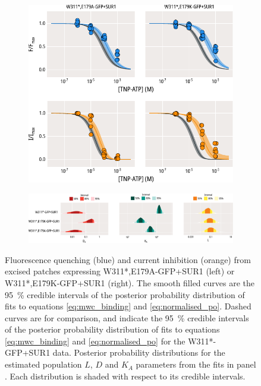 \begin{figure}[h]
	\centering
	\begin{subfigure}[t]{0.9\textwidth}
		\caption{}\label{ch5fig:mwc_e179_1}
		\centering
		\includegraphics[width=\textwidth]{mwc_e179_1.pdf}
	\end{subfigure}
	\vfill
	\begin{subfigure}[t]{0.9\textwidth}
		\caption{}\label{ch5fig:mwc_e179_2}
		\centering
		\includegraphics[width=\textwidth]{mwc_e179_2.pdf}
	\end{subfigure}
	\caption[E179 mutations affect gating and nucleotide binding]{
	 Fluorescence quenching (blue) and current inhibition (orange) from excised patches expressing W311*,E179A-GFP+SUR1 (left) or W311*,E179K-GFP+SUR1 (right).
	The smooth filled curves are the \SI{95}{\percent} credible intervals of the posterior probability distribution of fits to equations \ref{eq:mwc_binding} and \ref{eq:normalised_po}.
	Dashed curves are for comparison, and indicate the \SI{95}{\percent} credible intervals of the posterior probability distribution of fits to equations \ref{eq:mwc_binding} and \ref{eq:normalised_po} for the W311*-GFP+SUR1 data.
	 Posterior probability distributions for the estimated population $L$, $D$ and $K_A$ parameters from the fits in panel .
	Each distribution is shaded with respect to its credible intervals.
	}\label{ch5fig:e179_2}
\end{figure}

